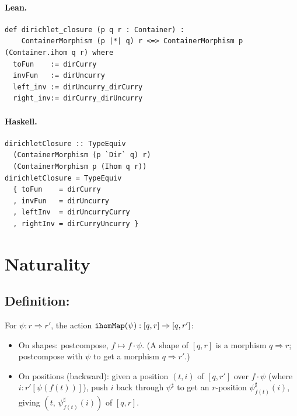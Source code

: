 \documentclass[11pt,a4paper]{article}
\begin{document}
\paragraph{Lean.}
\begin{lstlisting}[style=lean]
def dirichlet_closure (p q r : Container) :
    ContainerMorphism (p |*| q) r <=> ContainerMorphism p (Container.ihom q r) where
  toFun    := dirCurry
  invFun   := dirUncurry
  left_inv := dirUncurry_dirCurry
  right_inv:= dirCurry_dirUncurry
\end{lstlisting}

\paragraph{Haskell.}
\begin{lstlisting}[style=haskell]
dirichletClosure :: TypeEquiv
  (ContainerMorphism (p `Dir` q) r)
  (ContainerMorphism p (Ihom q r))
dirichletClosure = TypeEquiv
  { toFun    = dirCurry
  , invFun   = dirUncurry
  , leftInv  = dirUncurryCurry
  , rightInv = dirCurryUncurry }
\end{lstlisting}


\section{Naturality}

\subsection{Definition: }

\begin{defn}
For $\psi : r \Rightarrow r'$, the action
$\texttt{ihomMap}(\psi) : [q, r] \Rightarrow [q, r']$:
\begin{itemize}
  \item On shapes: postcompose, $f \mapsto f \cdot \psi$.
    (A shape of $[q,r]$ is a morphism $q \Rightarrow r$; postcompose with $\psi$
    to get a morphism $q \Rightarrow r'$.)
  \item On positions (backward): given a position $(t, i)$ of $[q, r']$ over
    $f \cdot \psi$ (where $i : r'[\psi(f(t))]$), push $i$ back through
    $\psi^\sharp$ to get an $r$-position $\psi^\sharp_{f(t)}(i)$, giving
    $(t,\, \psi^\sharp_{f(t)}(i))$ of $[q, r]$.
\end{itemize}
\end{defn}
\end{document}

